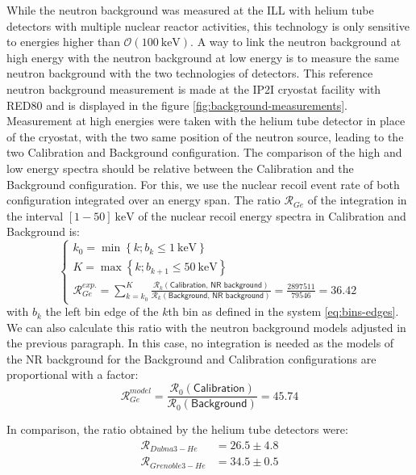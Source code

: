 While the neutron background was measured at the ILL with helium tube detectors with multiple nuclear reactor activities, this technology is only sensitive to energies higher than $\mathcal{O}(\SI{100}{\kilo\eV})$. A way to link the neutron background at high energy with the neutron background at low energy is to measure the same neutron background with the two technologies of detectors. This reference neutron background measurement is made at the IP2I cryostat facility with RED80 and is displayed in the figure \ref{fig:background-measurements}. Measurement at high energies were taken with the helium tube detector in place of the cryostat, with the two same position of the neutron source, leading to the two Calibration and Background configuration. The comparison of the high and low energy spectra should be relative between the Calibration and the Background configuration. For this, we use the nuclear recoil event rate of both configuration integrated over an energy span. The ratio $\mathcal{R}_{Ge}$ of the integration in the interval $[1-50]\ \si{\kilo\eV}$ of the nuclear recoil energy spectra in Calibration and Background is:
\begin{equation}
\begin{cases}
\displaystyle k_0 = \min \left\lbrace k; b_k \leq \SI{1}{\kilo\eV} \right\rbrace
\\
\displaystyle K = \max \left\lbrace k; b_{k+1} \leq \SI{50}{\kilo\eV} \right\rbrace
\\
\displaystyle \mathcal{R}_{Ge}^{exp.} = 
\sum_{k=k_0}^K 
\frac{
\mathcal{R}_k(\textsf{Calibration, NR background}) 
}{
\mathcal{R}_k(\textsf{Background, NR background}) 
}
=
\frac{ 2897511 }{ 79546 }
= 36.42
\end{cases}
\end{equation}
with $b_k$ the left bin edge of the $k$th bin as defined in the system \ref{eq:bins-edges}. We can also calculate this ratio with the neutron background models adjusted in the previous paragraph. In this case, no integration is needed as the models of the NR background for the Background and Calibration configurations are proportional with a factor:
\begin{equation}
\mathcal{R}_{Ge}^{model} = \frac{\mathcal{R}_0(\textsf{Calibration})}{\mathcal{R}_0(\textsf{Background})} = 45.74
\end{equation}

 In comparison, the ratio obtained by the helium tube detectors were:
\begin{equation}
\begin{array}{cc}
\mathcal{R}_{Dubna 3-He} &= 26.5 \pm 4.8 \\
\mathcal{R}_{Grenoble 3-He} &= 34.5 \pm 0.5
\end{array}
\end{equation}

